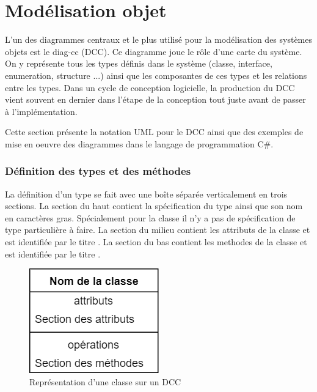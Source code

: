 \chapter{Modélisation objet}

\label{sec:dcc}

L'un des diagrammes centraux et le plus utilisé pour la modélisation des systèmes objets est le \gls{diag-cc} (\acrshort{DCC}). Ce diagramme joue le rôle d'une carte du système. On y représente tous les types définis dans le système (\gls{classe}, \gls{interface}, \gls{enumeration}, \gls{structure} ...) ainsi que les composantes de ces types et les relations entre les types. Dans un cycle de conception logicielle, la production du \acrshort{DCC} vient souvent en dernier dans l'étape de la conception tout juste avant de passer à l'implémentation.

Cette section présente la notation \acrshort{UML} pour le \acrshort{DCC} ainsi que des exemples de mise en oeuvre des diagrammes dans le langage de programmation C\#.

\subsection{Définition des types et des méthodes}
\label{ssec:dcc-type-methode}


La définition d'un type se fait avec une boîte séparée verticalement en trois sections. La section du haut contient la spécification du type ainsi que son nom en caractères gras. Spécialement pour la \gls{classe} il n'y a pas de spécification de type particulière à faire. La section du milieu contient les \glspl{attribut} de la classe et est identifiée par le titre . La section du bas contient les \glspl{methode} de la classe et est identifiée par le titre .

\begin{figure}[H]
	\caption{Représentation d'une \gls{classe} sur un \acrshort{DCC}}
	\centering
	\includegraphics[scale=0.4]{dcc-modele-type.png}
\end{figure}

